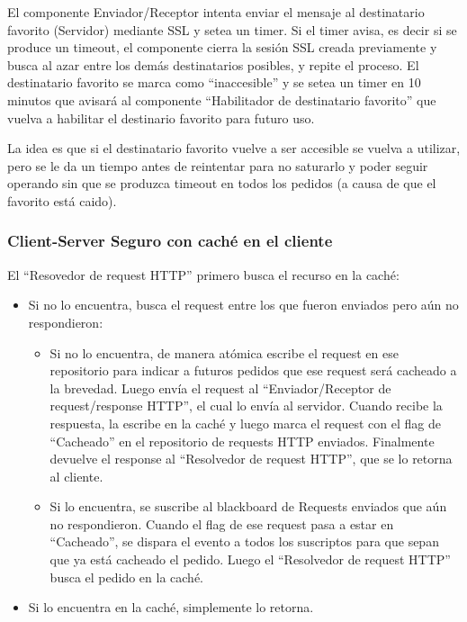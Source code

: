 El componente Enviador/Receptor intenta enviar el mensaje
al destinatario favorito (Servidor) mediante SSL y setea un timer.
Si el timer avisa, es decir si se produce un timeout, el componente
cierra la sesión SSL creada previamente y busca al azar entre los
demás destinatarios posibles, y repite el proceso. El destinatario
favorito se marca como ``inaccesible'' y se setea un timer en 10
minutos que avisará al componente ``Habilitador de destinatario
favorito'' que vuelva a habilitar el destinario favorito para
futuro uso.

La idea es que si el destinatario favorito vuelve a ser accesible se
vuelva a utilizar, pero se le da un tiempo antes de reintentar para
no saturarlo y poder seguir operando sin que se produzca timeout
en todos los pedidos (a causa de que el favorito está caido).

\subsubsection{Client-Server Seguro con caché en el cliente}


El ``Resovedor de request HTTP'' primero busca el recurso en la caché:
\begin{itemize}
	\item Si no lo encuentra, busca el request entre los que fueron enviados pero aún no respondieron:
	\begin{itemize}
		\item Si no lo encuentra, de manera atómica escribe el request en ese repositorio para indicar a futuros
        pedidos que ese request será cacheado a la brevedad. Luego envía el request al ``Enviador/Receptor de
        request/response HTTP'', el cual lo envía al servidor. Cuando recibe la respuesta, la escribe en la caché
        y luego marca el request con el flag de ``Cacheado'' en el repositorio de requests HTTP enviados. Finalmente
        devuelve el response al ``Resolvedor de request HTTP'', que se lo retorna al cliente.
        
        \item Si lo encuentra, se suscribe al blackboard de Requests enviados que aún no respondieron.
        Cuando el flag de ese request pasa a estar en ``Cacheado'', se dispara el evento
        a todos los suscriptos para que sepan que ya está cacheado el pedido. Luego el ``Resolvedor de
        request HTTP'' busca el pedido en la caché.
	\end{itemize}
	
	\item  Si lo encuentra en la caché, simplemente lo retorna.
\end{itemize}

